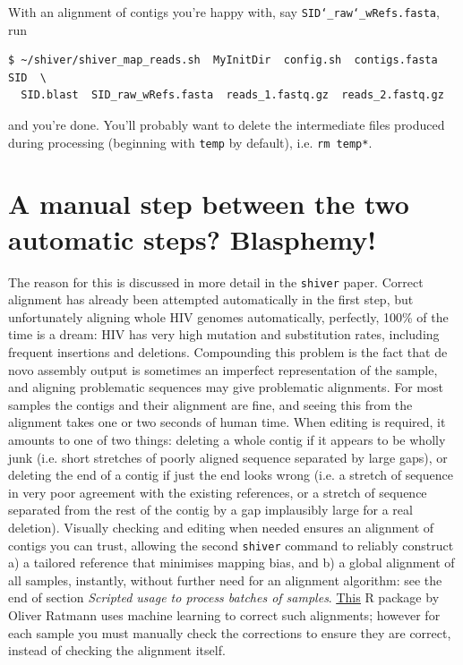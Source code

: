 \documentclass{article}
\newcommand{\shiv}{\texttt{shiver}\xspace}
\let\c\texttt
\newcommand{\www}{\color{blue} \underline}
\begin{document}
With an alignment of contigs you're happy with, say \c{SID\char`_raw\char`_wRefs.fasta}, run
\begin{Verbatim}[samepage=true]
$ ~/shiver/shiver_map_reads.sh  MyInitDir  config.sh  contigs.fasta  SID  \
  SID.blast  SID_raw_wRefs.fasta  reads_1.fastq.gz  reads_2.fastq.gz
\end{Verbatim}
and you're done.
You'll probably want to delete the intermediate files produced during processing (beginning with \c{temp} by default), i.e. \c{rm temp*}.

\section{A manual step between the two automatic steps? Blasphemy!}
The reason for this is discussed in more detail in the \shiv paper.
Correct alignment has already been attempted automatically in the first step, but unfortunately aligning whole HIV genomes automatically, perfectly, 100\% of the time is a dream: HIV has very high mutation and substitution rates, including frequent insertions and deletions.
Compounding this problem is the fact that de novo assembly output is sometimes an imperfect representation of the sample, and aligning problematic sequences may give problematic alignments. 
For most samples the contigs and their alignment are fine, and seeing this from the alignment takes one or two seconds of human time.
When editing is required, it amounts to one of two things: deleting a whole contig if it appears to be wholly junk (i.e. short stretches of poorly aligned sequence separated by large gaps), or deleting the end of a contig if just the end looks wrong (i.e. a stretch of sequence in very poor agreement with the existing references, or a stretch of sequence separated from the rest of the contig by a gap implausibly large for a real deletion).
Visually checking and editing when needed ensures an alignment of contigs you can trust, allowing the second \shiv command to reliably construct a) a tailored reference that minimises mapping bias, and b) a global alignment of all samples, instantly, without further need for an alignment algorithm: see the end of section {\it Scripted usage to process batches of samples}.  
\href{https://github.com/olli0601/PANGEAhaircut}{\www{This}} R package by Oliver Ratmann uses machine learning to correct such alignments; however for each sample you must manually check the corrections to ensure they are correct, instead of checking the alignment itself.
\end{document}
